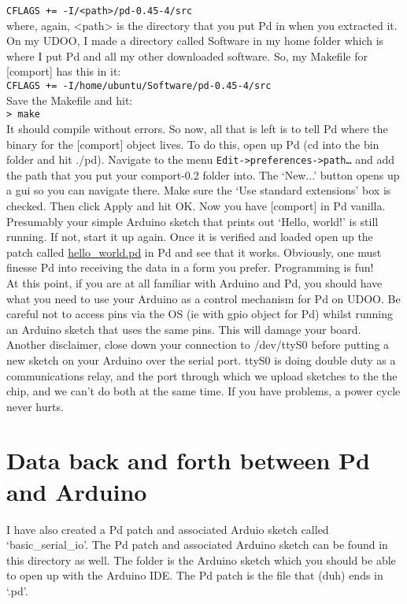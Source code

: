 \documentclass{article}
\begin{document}
\texttt{CFLAGS += -I/\textless{}path\textgreater{}/pd-0.45-4/src}\\

where, again, \textless{}path\textgreater{} is the directory that you put Pd in when you extracted it. On my UDOO, I made a directory called Software in my home folder which is where I put Pd and all my other downloaded software. So, my Makefile for [comport] has this in it:\\

\texttt{CFLAGS += -I/home/ubuntu/Software/pd-0.45-4/src}\\

Save the Makefile and hit: \\

\texttt{\textgreater{} make}\\

It should compile without errors. So now, all that is left is to tell Pd where the binary for the [comport] object lives. To do this, open up Pd (cd into the bin folder and hit ./pd). Navigate to the menu \texttt{Edit-\textgreater{}preferences-\textgreater{}path\ldots{}} and add the path that you put your comport-0.2 folder into. The `New...' button opens up a gui so you can navigate there. Make sure the `Use standard extensions' box is checked. Then click Apply and hit OK. Now you have [comport] in Pd vanilla.\\

Presumably your simple Arduino sketch that prints out `Hello, world!' is still running. If not, start it up again. Once it is verified and loaded open up the patch called \url{hello\_world.pd} in Pd and see that it works. Obviously, one must finesse Pd into receiving the data in a form you prefer. Programming is fun!\\

At this point, if you are at all familiar with Arduino and Pd, you should have what you need to use your Arduino as a control mechanism for Pd on UDOO. Be careful not to access pins via the OS (ie with gpio object for Pd) whilst running an Arduino sketch that uses the same pins. This will damage your board. Another disclaimer, close down your connection to /dev/ttyS0 before putting a new sketch on your Arduino over the serial port. ttyS0 is doing double duty as a communications relay, and the port through which we upload sketches to the the chip, and we can't do both at the same time. If you have problems, a power cycle never hurts.\\ 

\section{Data back and forth between Pd and Arduino}
I have also created a Pd patch and associated Arduio sketch called `basic\_serial\_io'. The Pd patch and associated Arduino sketch can be found in this directory as well. The folder is the Arduino sketch which you should be able to open up with the Arduino IDE. The Pd patch is the file that (duh) ends in `.pd'. 
\end{document}

